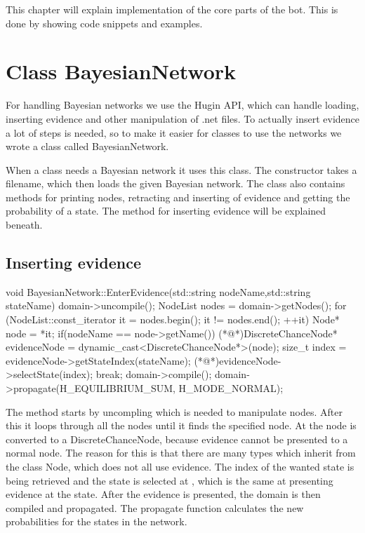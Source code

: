 This chapter will explain implementation of the core parts of the bot. This is done by showing code snippets and examples.


\section{Class BayesianNetwork}
	For handling Bayesian networks we use the Hugin API, which can handle loading, inserting evidence and other manipulation of .net files. To actually 
	insert evidence a lot of steps is needed, so to make it easier for classes to use the networks we wrote a class called BayesianNetwork.

	When a class needs a Bayesian network it uses this class. The constructor takes a filename, which then loads the given 
	Bayesian network. The class also contains methods for printing nodes, retracting and inserting of evidence and getting the probability of a state. 
	The method for inserting evidence will be explained beneath.
	\subsection*{Inserting evidence}
		\begin{Sourcecode}[caption=EnterEvidence method]
void BayesianNetwork::EnterEvidence(std::string nodeName,std::string stateName)
{
domain->uncompile();
NodeList nodes = domain->getNodes();
for (NodeList::const_iterator it = nodes.begin(); it != nodes.end(); ++it)
{
	Node* node = *it;
	if(nodeName == node->getName())
	{
		(*@\lnote@*)DiscreteChanceNode* evidenceNode = dynamic_cast<DiscreteChanceNode*>(node);
		size_t index = evidenceNode->getStateIndex(stateName);
		(*@\lnote@*)evidenceNode->selectState(index);
		break;
	}
}
domain->compile();
domain->propagate(H_EQUILIBRIUM_SUM, H_MODE_NORMAL);
}
		\end{Sourcecode}
		The method starts by uncompling which is needed to manipulate nodes. After this it loops through all the nodes until it finds the specified 
		node. At  the node is converted to a DiscreteChanceNode, because evidence cannot be presented to a normal node. The reason for this 
		is that there are many types which inherit from the class Node, which does not all use evidence. The index of the wanted state is being 
		retrieved and the state is selected at , which is the same at presenting evidence at the state. After the evidence is presented, the 
		domain is then compiled and propagated. The propagate function calculates the new probabilities for the states in the network.